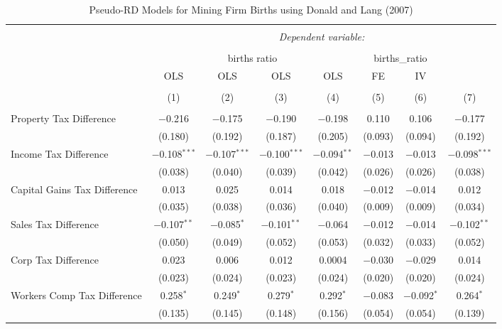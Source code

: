 
\begin{table}[!htbp] \centering 
  \caption{Pseudo-RD Models for  Mining Firm Births using Donald and Lang (2007)} 
  \label{} 
\begin{tabular}{@{\extracolsep{5pt}}lccccccc} 
\\[-1.8ex]\hline 
\hline \\[-1.8ex] 
 & \multicolumn{7}{c}{\textit{Dependent variable:}} \\ 
\cline{2-8} 
\\[-1.8ex] & \multicolumn{4}{c}{births ratio} & \multicolumn{2}{c}{births\_ratio} &   \\ 
 & OLS & OLS & OLS & OLS & FE & IV &  \\ 
\\[-1.8ex] & (1) & (2) & (3) & (4) & (5) & (6) & (7)\\ 
\hline \\[-1.8ex] 
 Property Tax Difference & $-$0.216 & $-$0.175 & $-$0.190 & $-$0.198 & 0.110 & 0.106 & $-$0.177 \\ 
  & (0.180) & (0.192) & (0.187) & (0.205) & (0.093) & (0.094) & (0.192) \\ 
  Income Tax Difference & $-$0.108$^{***}$ & $-$0.107$^{***}$ & $-$0.100$^{***}$ & $-$0.094$^{**}$ & $-$0.013 & $-$0.013 & $-$0.098$^{***}$ \\ 
  & (0.038) & (0.040) & (0.039) & (0.042) & (0.026) & (0.026) & (0.038) \\ 
  Capital Gains Tax Difference & 0.013 & 0.025 & 0.014 & 0.018 & $-$0.012 & $-$0.014 & 0.012 \\ 
  & (0.035) & (0.038) & (0.036) & (0.040) & (0.009) & (0.009) & (0.034) \\ 
  Sales Tax Difference & $-$0.107$^{**}$ & $-$0.085$^{*}$ & $-$0.101$^{**}$ & $-$0.064 & $-$0.012 & $-$0.014 & $-$0.102$^{**}$ \\ 
  & (0.050) & (0.049) & (0.052) & (0.053) & (0.032) & (0.033) & (0.052) \\ 
  Corp Tax Difference & 0.023 & 0.006 & 0.012 & 0.0004 & $-$0.030 & $-$0.029 & 0.014 \\ 
  & (0.023) & (0.024) & (0.023) & (0.024) & (0.020) & (0.020) & (0.024) \\ 
  Workers Comp Tax Difference & 0.258$^{*}$ & 0.249$^{*}$ & 0.279$^{*}$ & 0.292$^{*}$ & $-$0.083 & $-$0.092$^{*}$ & 0.264$^{*}$ \\ 
  & (0.135) & (0.145) & (0.148) & (0.156) & (0.054) & (0.054) & (0.139) \\ 

\end{tabular}
\end{table}
